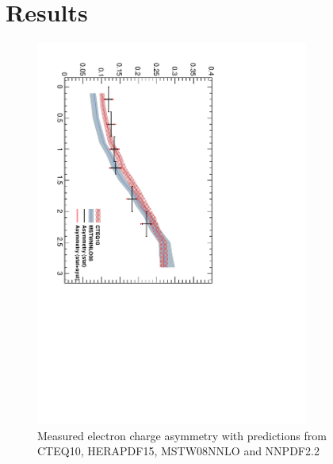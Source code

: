 \section{Results}


\begin{figure}[htbp]
  \begin{center}
\includegraphics*[width=0.80\textwidth]{Asym_35}
  \caption{\label{fig:asym35} Measured electron charge asymmetry with predictions from CTEQ10, HERAPDF15, MSTW08NNLO and NNPDF2.2}
  \end{center}
\end{figure}

